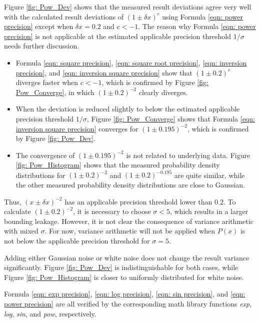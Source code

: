 \documentclass[twoside]{article}
\numberwithin{equation}{section}
\begin{document}
Figure \ref{fig: Pow_Dev} shows that the measured result deviations agree very well with the calculated result deviations of $(1 \pm \delta x)^c$ using Formula \eqref{eqn: power precision} except when $\delta x =0.2$ and $c < -1$. 
The reason why Formula \eqref{eqn: power precision} is not applicable at the estimated applicable precision threshold $1/\sigma$ needs further discussion.
\begin{itemize}
\item 
Formula \eqref{eqn: square precision}, \eqref{eqn: square root precision}, \eqref{eqn: inversion precision}, and \eqref{eqn: inversion square precision} show that $(1 \pm 0.2)^c$ diverges faster when $c<-1$, which is confirmed by Figure \ref{fig: Pow_Converge}, in which $(1 \pm 0.2)^{-2}$ clearly diverges.

\item 
When the deviation is reduced slightly to below the estimated applicable precision threshold $1/\sigma$, Figure \ref{fig: Pow_Converge} shows that Formula \eqref{eqn: inversion square precision} converges for $(1 \pm 0.195)^{-2}$, which is confirmed by Figure \ref{fig: Pow_Dev}.

\item
The convergence of $(1 \pm 0.195)^{-2}$ is not related to underlying data.
Figure \ref{fig: Pow_Histogram} shows that the measured probability density distributions for  $(1 \pm 0.2)^{-2}$ and  $(1 \pm 0.2)^{-0.195}$ are quite similar, while the other measured probability density distributions are close to Gaussian.

\end{itemize}

Thus, $(x \pm \delta x)^{-2}$ has an  applicable precision threshold lower than $0.2$.
To calculate $(1 \pm 0.2)^{-2}$, it is necessary to choose $\sigma < 5$, which results in a larger bounding leakage.
However, it is not clear the consequence of variance arithmetic with mixed $\sigma$.
For now, variance arithmetic will not be applied when $P(x)$ is not below the applicable precision threshold for $\sigma=5$.

Adding either Gaussian noise or white noise does not change the result variance significantly.
Figure \ref{fig: Pow_Dev} is indistinguishable for both cases, while Figure \ref{fig: Pow_Histogram} is closer to uniformly distributed for white noise.

Formula \eqref{eqn: exp precision}, \eqref{eqn: log precision}, \eqref{eqn: sin precision}, and \eqref{eqn: power precision} are all verified by the corresponding math library functions \textit{exp}, \textit{log}, \textit{sin}, and \textit{pow}, respectively.
\end{document}
